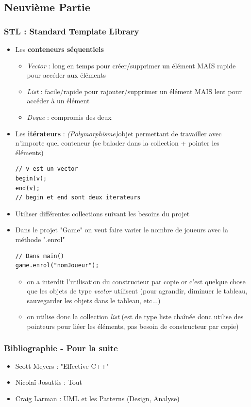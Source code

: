 \documentclass[12pt,a4paper]{article}
\begin{document}
\subsection{Neuvième Partie}
\subsubsection{STL : Standard Template Library}
\begin{itemize}
\item Les \textbf{conteneurs séquentiels}
\begin{itemize}
\item \textit{Vector} : long en temps pour créer/supprimer un élément MAIS rapide pour accéder aux éléments
\item \textit{List} : facile/rapide pour rajouter/supprimer un élément MAIS lent pour accéder à un élément
\item \textit{Deque} : compromis des deux
\end{itemize}
\item Les \textbf{itérateurs} : \textit{(Polymorphisme)}objet permettant de travailler avec n'importe quel conteneur (se balader dans la collection + pointer les éléments)
\begin{lstlisting}
// v est un vector
begin(v);
end(v); 
// begin et end sont deux iterateurs
\end{lstlisting}
\item Utiliser différentes collections suivant les besoins du projet
\item Dans le projet "Game" on veut faire varier le nombre de joueurs avec la méthode ".enrol"
\begin{lstlisting}
// Dans main()
game.enrol("nomJoueur");
\end{lstlisting}
\begin{itemize}
\item on a interdit l'utilisation du constructeur par copie or c'est quelque chose que les objets de type \textit{vector} utilisent (pour agrandir, diminuer le tableau, sauvegarder les objets dans le tableau, etc...)
\item on utilise donc la collection \textit{list} (est de type liste chaînée donc utilise des pointeurs pour liéer les éléments, pas besoin de constructeur par copie)
\end{itemize}
\end{itemize}
\subsubsection{Bibliographie - Pour la suite}
\begin{itemize}
\item Scott Meyers : "Effective C++"
\item Nicolaï Josuttis : Tout
\item Craig Larman : UML et les Patterns (Design, Analyse)
\end{itemize}
\end{document}
